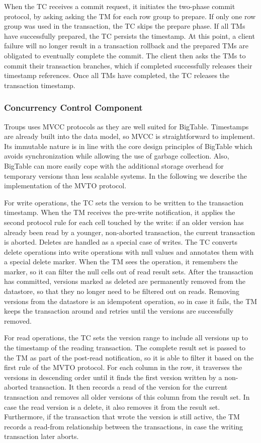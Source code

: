\documentclass[10pt,final,journal]{IEEEtran}
\begin{document}
When the TC receives a commit request, it initiates the two-phase commit protocol, by asking asking the TM for each row group to prepare. If only one row group was used in the transaction, the TC skips the prepare phase. If all TMs have successfully prepared, the TC persists the timestamp. At this point, a client failure will no longer result in a transaction rollback and the prepared TMs are obligated to eventually complete the commit. The client then asks the TMs to commit their transaction branches, which if completed successfully releases their timestamp references. Once all TMs have completed, the TC releases the transaction timestamp.

\subsubsection{Concurrency Control Component}
Troups uses MVCC protocols as they are well suited for BigTable. Timestamps are already built into the data model, so MVCC is straightforward to implement. Its immutable nature is in line with the core design principles of BigTable which avoids synchronization while allowing the use of garbage collection. Also, BigTable can more easily cope with the additional storage overhead for temporary versions than less scalable systems. In the following we describe the implementation of the MVTO protocol.

For write operations, the TC sets the version to be written to the transaction timestamp. When the TM receives the pre-write notification, it applies the second protocol rule for each cell touched by the write: if an older version has already been read by a younger, non-aborted transaction, the current transaction is aborted. Deletes are handled as a special case of writes. The TC converts delete operations into write operations with null values and annotates them with a special delete marker. When the TM sees the operation, it remembers the marker, so it can filter the null cells out of read result sets. After the transaction has committed, versions marked as deleted are permanently removed from the datastore, so that they no longer need to be filtered out on reads. Removing versions from the datastore is an idempotent operation, so in case it fails, the TM keeps the transaction around and retries until the versions are successfully removed.

For read operations, the TC sets the version range to include all versions up to the timestamp of the reading transaction. The complete result set is passed to the TM as part of the post-read notification, so it is able to filter it based on the first rule of the MVTO protocol. For each column in the row, it traverses the versions in descending order until it finds the first version written by a non-aborted transaction. It then records a read of the version for the current transaction and removes all older versions of this column from the result set. In case the read version is a delete, it also removes it from the result set. Furthermore, if the transaction that wrote the version is still active, the TM records a read-from relationship between the transactions, in case the writing transaction later aborts.
\end{document}
